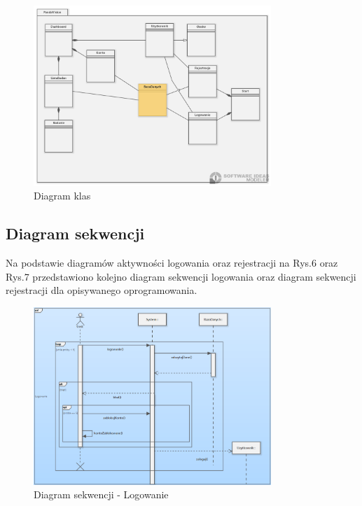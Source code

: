 \documentclass[12pt, letterpaper]{article}
\begin{document}
\begin{figure}[h]
  \centering
      \includegraphics[width=0.8\textwidth]{classDiagram}
  \caption{Diagram klas}
\end{figure}
		
		
		\newpage

		\subsection{Diagram sekwencji}
		
		Na podstawie diagramów aktywności logowania oraz rejestracji na Rys.6 oraz Rys.7 przedstawiono kolejno diagram sekwencji logowania oraz diagram sekwencji rejestracji dla opisywanego oprogramowania.
		
\begin{figure}[h]
  \centering
      \includegraphics[width=0.8\textwidth]{seqDiagram}
  \caption{Diagram sekwencji - Logowanie}
\end{figure}
\end{document}
